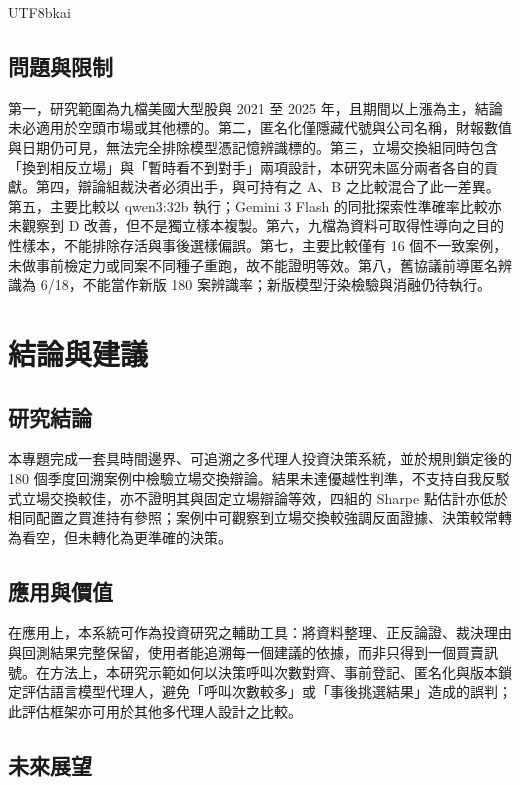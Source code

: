 \documentclass[12pt,a4paper]{article}
\newcommand{\grp}[1]{\textsf{#1}}
\begin{document}
\begin{CJK}{UTF8}{bkai}
\subsection{問題與限制}

第一，研究範圍為九檔美國大型股與 2021 至 2025 年，且期間以上漲為主，結論未必適用於空頭市場或其他標的。第二，匿名化僅隱藏代號與公司名稱，財報數值與日期仍可見，無法完全排除模型憑記憶辨識標的。第三，立場交換組同時包含「換到相反立場」與「暫時看不到對手」兩項設計，本研究未區分兩者各自的貢獻。第四，辯論組裁決者必須出手，與可持有之 \grp{A}、\grp{B} 之比較混合了此一差異。第五，主要比較以 qwen3:32b 執行；Gemini 3 Flash 的同批探索性準確率比較亦未觀察到 D 改善，但不是獨立樣本複製。第六，九檔為資料可取得性導向之目的性樣本，不能排除存活與事後選樣偏誤。第七，主要比較僅有 16 個不一致案例，未做事前檢定力或同案不同種子重跑，故不能證明等效。第八，舊協議前導匿名辨識為 6/18，不能當作新版 180 案辨識率；新版模型汙染檢驗與消融仍待執行。

\section{結論與建議}

\subsection{研究結論}

本專題完成一套具時間邊界、可追溯之多代理人投資決策系統，並於規則鎖定後的 180 個季度回溯案例中檢驗立場交換辯論。結果未達優越性判準，不支持自我反駁式立場交換較佳，亦不證明其與固定立場辯論等效，四組的 Sharpe 點估計亦低於相同配置之買進持有參照；案例中可觀察到立場交換較強調反面證據、決策較常轉為看空，但未轉化為更準確的決策。

\subsection{應用與價值}

在應用上，本系統可作為投資研究之輔助工具：將資料整理、正反論證、裁決理由與回測結果完整保留，使用者能追溯每一個建議的依據，而非只得到一個買賣訊號。在方法上，本研究示範如何以決策呼叫次數對齊、事前登記、匿名化與版本鎖定評估語言模型代理人，避免「呼叫次數較多」或「事後挑選結果」造成的誤判；此評估框架亦可用於其他多代理人設計之比較。

\subsection{未來展望}


\end{CJK}
\end{document}
